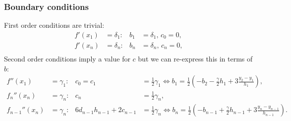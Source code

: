 \documentclass[11pt]{article}
\newcommand{\equivalent}{\Leftrightarrow}
\theoremstyle{break}            %
\begin{document}
\subsubsection*{Boundary conditions}
First order conditions are trivial:
\begin{equation*}
\begin{aligned}
    f'(x_1)&=\delta_1: & b_1 & = \delta_1,\, c_0 = 0,\\
    f'(x_n)&=\delta_n: & b_n & = \delta_n,\, c_n = 0,\\
\end{aligned}
\end{equation*}
Second order conditions imply a value for $c$ but we can re-express
this in terms of $b$:
\begin{equation*}
\begin{aligned}
    f''(x_1)&=\gamma_1: & c_0 = c_1 &= \frac{1}{2}\gamma_1 \equivalent
        b_1 = \frac{1}{2}\left(-b_2 -\frac{\gamma}{2} h_1
            + 3 \frac{y_2-y_1}{h_1}\right),\\
    f_n''(x_n)&=\gamma_n: & c_n &= \frac{1}{2}\gamma_n,\\
            f_{n-1}''(x_n)&=\gamma_n: & 6 d_{n-1}h_{n-1} + 2 c_{n-1} &= \frac{1}{2}\gamma_n \equivalent 
            b_n = \frac{1}{2}\left(-b_{n-1} +\frac{\gamma}{2} h_{n-1}
            + 3 \frac{y_n-y_{n-1}}{h_{n-1}}\right).\\
\end{aligned}
\end{equation*}
\end{document}
